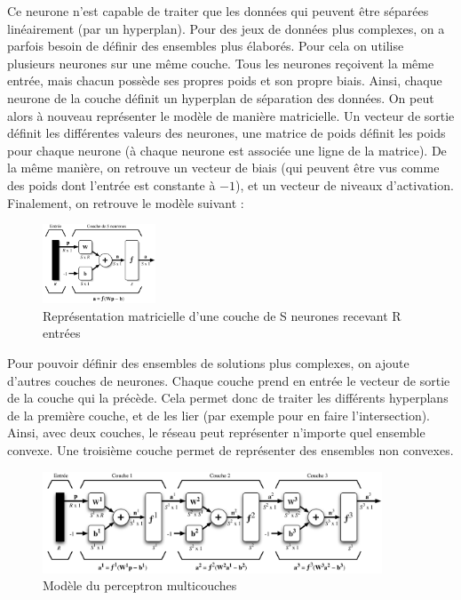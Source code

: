 Ce neurone n'est capable de traiter que les données qui peuvent être séparées linéairement (par un hyperplan). Pour des jeux de données plus complexes, on a parfois besoin de définir des ensembles plus élaborés.
Pour cela on utilise plusieurs neurones sur une même couche. Tous les neurones reçoivent la même entrée, mais chacun possède ses propres poids et son propre biais.
Ainsi, chaque neurone de la couche définit un hyperplan de séparation des données. On peut alors à nouveau représenter le modèle de manière matricielle.
Un vecteur de sortie définit les différentes valeurs des neurones, une matrice de poids définit les poids pour chaque neurone (à chaque neurone est associée une ligne de la matrice). De la même manière, on retrouve un vecteur de biais (qui peuvent être vus comme des poids dont l'entrée est constante à $-1$), et un vecteur de niveaux d'activation. Finalement, on retrouve le modèle suivant :

\begin{figure}[h]
 \centering
 \includegraphics[width=0.3\textwidth]{img/couche.png}
 \caption[Modèle d'une couche de neurones]{Représentation matricielle d'une couche de S neurones recevant R entrées}
\end{figure}

Pour pouvoir définir des ensembles de solutions plus complexes, on ajoute d'autres couches de neurones. Chaque couche prend en entrée le vecteur de sortie de la couche qui la précède. Cela permet donc de traiter les différents hyperplans de la première couche, et de les lier (par exemple pour en faire l'intersection). Ainsi, avec deux couches, le réseau peut représenter n'importe quel ensemble convexe. Une troisième couche permet de représenter des ensembles non convexes.

\begin{figure}[h]
 \centering
 \includegraphics[width=0.9\textwidth]{img/modele_perceptron_multicouches.png}
 \caption{Modèle du perceptron multicouches}
\end{figure}


